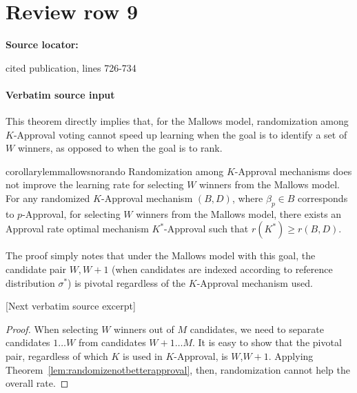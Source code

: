 \documentclass[10pt]{article}
\begin{document}
\section*{Review row 9}
\textbf{Source locator:} {\footnotesize\raggedright cited publication, lines 726-\allowbreak{}734\par}
\paragraph{Verbatim source input}
\begin{ReviewVerbatim}
This theorem directly implies that, for the Mallows model, randomization among $K$-Approval voting cannot speed up learning when the goal is to identify a set of $W$ winners, as opposed to when the goal is to rank.

\begin{restatable}{corollary}{lemmallowsnorando}
	\label{lem:mallowsnorando}
			Randomization among $K$-Approval mechanisms does not improve the learning rate for selecting $W$ winners from the Mallows model. For any randomized $K$-Approval mechanism $(B,D)$, where $\beta_p\in B$ corresponds to $p$-Approval, for selecting $W$ winners from the Mallows model, there exists an Approval rate optimal mechanism $K^*$-Approval such that $r(K^*) \geq r(B,D)$.

\end{restatable}

The proof simply notes that under the Mallows model with this goal, the candidate pair $W, W+1$ (when candidates are indexed according to reference distribution $\sigma^*$) is pivotal regardless of the $K$-Approval mechanism used.

[Next verbatim source excerpt]

\lemmallowsnorando*
\begin{proof}
	When selecting $W$ winners out of $M$ candidates, we need to separate candidates $1 \dots W$ from candidates $W + 1 \dots M$. It is easy to show that the pivotal pair, regardless of which $K$ is used in $K$-Approval, is $W$,$W+1$. Applying Theorem~\ref{lem:randomizenotbetterapproval}, then, randomization cannot help the overall rate.
\end{proof}
\end{ReviewVerbatim}
\end{document}
